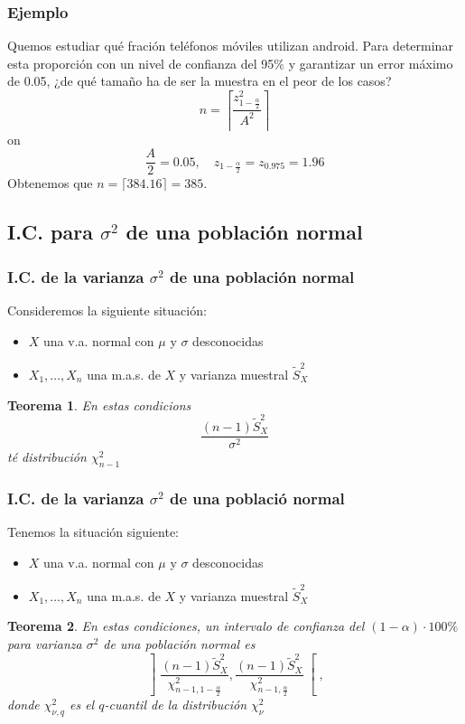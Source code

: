 \documentclass[12pt,t]{beamer}\usepackage[]{graphicx}\usepackage[]{color}
\renewcommand{\emph}[1]{{\color{red}#1}}
\theoremstyle{plain}
\newtheorem{teorema}{Teorema}
\theoremstyle{definition}
\begin{document}
\begin{frame}
\frametitle{Ejemplo}
Quemos estudiar qué fración teléfonos móviles utilizan android. Para determinar esta proporción con un  nivel de confianza  del 95\%
y garantizar un error máximo de 0.05, ¿de qué  tamaño  ha de ser la muestra \emph{en el peor de los casos}?
$$
n=\left\lceil\frac{z_{1-\frac{\alpha}{2}}^2}{A^2}\right\rceil
$$
on
$$
\frac{A}{2}=0.05,\quad z_{1-\frac{\alpha}{2}}=z_{0.975}=1.96
$$
Obtenemos que  $n= \lceil 384.16\rceil=385$.

\end{frame}




\subsection{I.C. para $\sigma^2$ de una población normal}

\begin{frame}
\frametitle{I.C. de la varianza $\sigma^2$ de una población normal}



Consideremos  la siguiente situación:
\begin{itemize}
\item  $X$ una v.a. normal con $\mu$ y $\sigma$ desconocidas

\item $X_1,\ldots,X_n$ una m.a.s. de $X$ y varianza muestral $\widetilde{S}_X^2$
\end{itemize}


\begin{teorema}
En estas  condicions
$$
\frac{(n-1) \tilde{S}_{X}^2}{\sigma^2}
$$
té distribución $\chi^2_{n-1}$
\end{teorema}
\end{frame}

\begin{frame}
\frametitle{I.C. de la varianza $\sigma^2$ de una població normal}
Tenemos  la situación siguiente:

\begin{itemize}
\item  $X$ una v.a. normal con $\mu$ y $\sigma$ desconocidas
\item $X_1,\ldots,X_n$ una m.a.s. de $X$ y varianza muestral $\widetilde{S}_X^2$
\end{itemize}

\begin{teorema}
En estas  condiciones,  un intervalo  de confianza  del $(1-\alpha)\cdot 100\%$ para varianza $\sigma^2$ de una población normal es 
$$
\left] \frac{(n-1)\widetilde{S}_{X}^2}{\chi_{n-1,1-\frac{\alpha}{2}}^2},
\frac{(n-1)\widetilde{S}_{X}^2}{\chi_{n-1,\frac{\alpha}{2}}^2}
\right[,
$$
donde $\chi_{\nu,q}^2$ es el $q$-cuantil de la distribución $\chi_{\nu}^2$
\end{teorema}
\end{frame}
\end{document}
